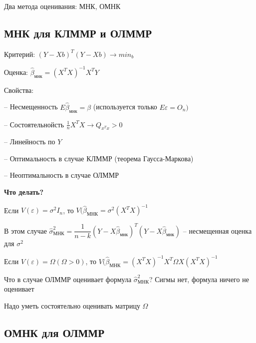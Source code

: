 \documentclass{article}
\begin{document}
\vspace{1mm}
Два метода оценивания: МНК, ОМНК \par

\subsection{МНК для КЛММР и ОЛММР}
Критерий: $(Y - Xb)^T(Y - Xb) \longrightarrow min_b$ \par
Оценка: $\hat{\beta}_{\text{мнк}} = (X^TX)^{-1}X^TY$ \par

\vspace{1mm}
Свойства:\par
-- Несмещенность $E\hat{\beta}_{\text{мнк}} = \beta$ (используется только $E\varepsilon = O_n)$\par
-- Состоятельнойсть $\frac{1}{n}X^TX \longrightarrow Q_{x^Tx} >0$\par
-- Линейность по $Y$\par
-- Оптимальность в случае КЛММР (теорема Гаусса-Маркова)\par
-- Неоптимальность в случае ОЛММР\par

\vspace{2mm}
\textbf{Что делать?}\par
Если $V(\varepsilon) = \sigma^2I_n$, то $V(\hat{\beta}_{\text{МНК}} = \sigma^2(X^TX)^{-1}$\par
В этом случае $\hat{\sigma}^2_\text{МНК} = \dfrac{1}{n-k}(Y-X\hat{\beta}_{\text{мнк}})^T(Y-X\hat{\beta}_{\text{мнк}})$ -- несмещенная оценка для $\sigma^2$\par

\vspace{2mm}
Если $V(\varepsilon) = \Omega (\Omega > 0)$, то $V(\hat{\beta}_{\text{МНК}} = (X^TX)^{-1}X^T\Omega X(X^TX)^{-1}$\par

\vspace{2mm}
Что в случае ОЛММР оценивает формула $\hat{\sigma}^2_\text{МНК}$? Сигмы нет, формула ничего не оценивает\par

\vspace{2mm}
Надо уметь состоятельно оценивать матрицу $\Omega$\par

\subsection{ОМНК для ОЛММР}
\end{document}
